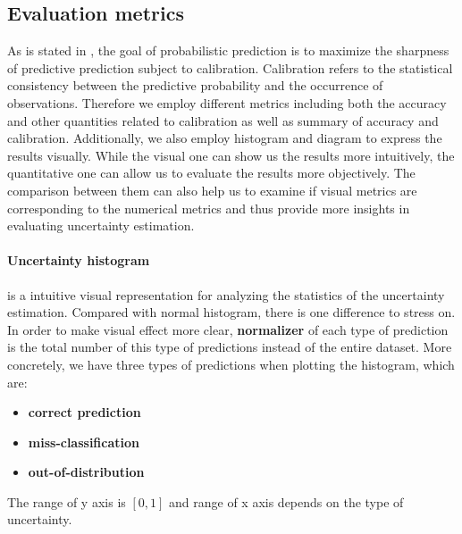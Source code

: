 \subsection{Evaluation metrics}
As is stated in \cite{gneiting2007probabilistic}, the goal of probabilistic prediction is to maximize the sharpness of predictive prediction subject to calibration. Calibration refers to the statistical consistency between the predictive probability and the occurrence of observations. Therefore we employ different metrics including both the accuracy and other quantities related to calibration as well as summary of accuracy and calibration. Additionally, we also employ histogram and diagram to express the results visually. While the visual one can show us the results more intuitively, the quantitative one can allow us to evaluate the results more objectively. The comparison between them can also help us to examine if visual metrics are corresponding to the numerical metrics and thus provide more insights in evaluating uncertainty estimation. 

\paragraph{Uncertainty histogram} is a intuitive visual representation for analyzing the statistics of the uncertainty estimation. Compared with normal histogram, there is one difference to stress on. In order to make visual effect more clear, \textbf{normalizer} of each type of prediction is the total number of this type of predictions instead of the entire dataset. More concretely, we have three types of predictions when plotting the histogram, which are:
 \begin{itemize}
 	\item \textbf{correct prediction}
 	\item \textbf{miss-classification}
 	\item \textbf{out-of-distribution}
 \end{itemize}The range of y axis is $[0,1]$  and range of x axis depends on the type of uncertainty.

